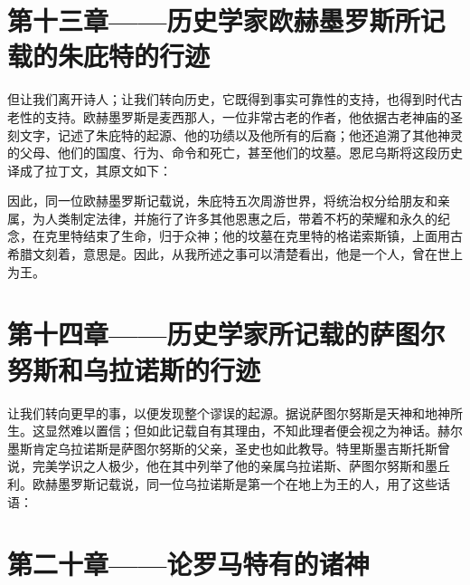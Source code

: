 
\section{第十三章——历史学家欧赫墨罗斯所记载的朱庇特的行迹}

但让我们离开诗人；让我们转向历史，它既得到事实可靠性的支持，也得到时代古老性的支持。欧赫墨罗斯是麦西那人，一位非常古老的作者，他依据古老神庙的圣刻文字，记述了朱庇特的起源、他的功绩以及他所有的后裔；他还追溯了其他神灵的父母、他们的国度、行为、命令和死亡，甚至他们的坟墓。恩尼乌斯将这段历史译成了拉丁文，其原文如下：\par

\par

因此，同一位欧赫墨罗斯记载说，朱庇特五次周游世界，将统治权分给朋友和亲属，为人类制定法律，并施行了许多其他恩惠之后，带着不朽的荣耀和永久的纪念，在克里特结束了生命，归于众神；他的坟墓在克里特的格诺索斯镇，上面用古希腊文刻着，意思是。因此，从我所述之事可以清楚看出，他是一个人，曾在世上为王。\par


\section{第十四章——历史学家所记载的萨图尔努斯和乌拉诺斯的行迹}

让我们转向更早的事，以便发现整个谬误的起源。据说萨图尔努斯是天神和地神所生。这显然难以置信；但如此记载自有其理由，不知此理者便会视之为神话。赫尔墨斯肯定乌拉诺斯是萨图尔努斯的父亲，圣史也如此教导。特里斯墨吉斯托斯曾说，完美学识之人极少，他在其中列举了他的亲属乌拉诺斯、萨图尔努斯和墨丘利。欧赫墨罗斯记载说，同一位乌拉诺斯是第一个在地上为王的人，用了这些话语：\par


\section{第二十章——论罗马特有的诸神}

